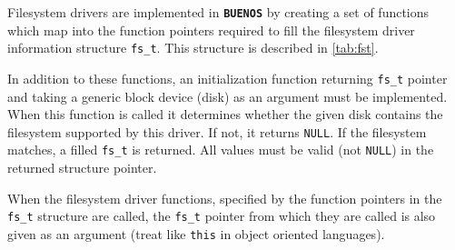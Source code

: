 \documentclass[twoside,a4paper]{report}
\newcommand{\buenos}{\texttt{\textbf{BUENOS}}}
\begin{document}

Filesystem drivers are implemented in \buenos{} by creating a set of
functions which map into the function pointers required to fill the
filesystem driver information structure
\texttt{fs\_t}. This structure is
described in \autoref{tab:fst}.

In addition to these functions, an initialization function returning
\texttt{fs\_t} pointer and taking a generic block device (disk) as an
argument must be implemented. When this function is called it
determines whether the given disk contains the filesystem supported by
this driver. If not, it returns \texttt{NULL}. If the filesystem
matches, a filled \texttt{fs\_t} is returned. All values must be valid
(not \texttt{NULL}) in the returned structure pointer.

When the filesystem driver functions, specified by the function
pointers in the \texttt{fs\_t} structure are called, the
\texttt{fs\_t} pointer from which they are called is also given as an
argument (treat like \texttt{this} in object oriented languages).
\end{document}
